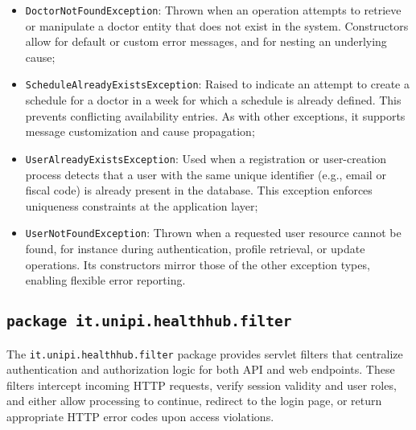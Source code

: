 \begin{itemize}
	\item \texttt{DoctorNotFoundException}:  
	Thrown when an operation attempts to retrieve or manipulate a doctor entity that does not exist in the system. Constructors allow for default or custom error messages, and for nesting an underlying cause;
	
	\item \texttt{ScheduleAlreadyExistsException}:  
	Raised to indicate an attempt to create a schedule for a doctor in a week for which a schedule is already defined. This prevents conflicting availability entries. As with other exceptions, it supports message customization and cause propagation;
	
	\item \texttt{UserAlreadyExistsException}:  
	Used when a registration or user-creation process detects that a user with the same unique identifier (e.g., email or fiscal code) is already present in the database. This exception enforces uniqueness constraints at the application layer;
	
	\item \texttt{UserNotFoundException}:  
	Thrown when a requested user resource cannot be found, for instance during authentication, profile retrieval, or update operations. Its constructors mirror those of the other exception types, enabling flexible error reporting.
\end{itemize}

\subsection{\texttt{package it.unipi.healthhub.filter}}
The \texttt{it.unipi.healthhub.filter} package provides servlet filters that centralize authentication and authorization logic for both API and web endpoints. These filters intercept incoming HTTP requests, verify session validity and user roles, and either allow processing to continue, redirect to the login page, or return appropriate HTTP error codes upon access violations.

